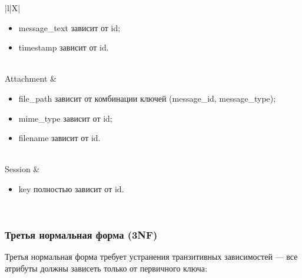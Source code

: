 \begin{xltabular}{\linewidth}{|l|X|}
\begin{itemize}[leftmargin=*]
		\item message\_text зависит от id;
		\item timestamp зависит от id.
	\end{itemize} \\ \hline
	Attachment &
	\begin{itemize}[leftmargin=*]
		\item file\_path зависит от комбинации ключей (message\_id, message\_type);
		\item mime\_type зависит от id;
		\item filename зависит от id.
	\end{itemize} \\ \hline
	Session &
	\begin{itemize}[leftmargin=*]
		\item key полностью зависит от id.
	\end{itemize} \\ \hline
\end{xltabular}

\bigskip

\subsubsection{Третья нормальная форма (3NF)}

Третья нормальная форма требует устранения транзитивных зависимостей — все атрибуты должны зависеть только от первичного ключа:

